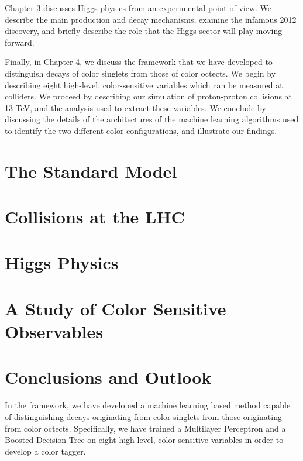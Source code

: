 \documentclass[10pt,a4paper]{book}
\begin{document}
Chapter 3 discusses Higgs physics from an experimental point of view. We describe the main production and decay mechanisms, examine the infamous 2012 discovery, and briefly describe the role that the Higgs sector will play moving forward.

Finally, in Chapter 4, we discuss the framework that we have developed to distinguish decays of color singlets from those of color octects. We begin by describing eight high-level, color-sensitive variables which can be measured at colliders. We proceed by describing our simulation of proton-proton collisions at 13 TeV, and the analysis used to extract these variables. We conclude by discussing the details of the architectures of the machine learning algorithms used to identify the two different color configurations, and illustrate our findings.

\chapter{The Standard Model}


\chapter{Collisions at the LHC}


\chapter{Higgs Physics}


\chapter{A Study of Color Sensitive Observables}


\chapter*{Conclusions and Outlook}

In the framework, we have developed a machine learning based method capable of distinguishing decays originating from color singlets from those originating from color octects. Specifically, we have trained a Multilayer Perceptron and a Boosted Decision Tree on eight high-level, color-sensitive variables in order to develop a color tagger.
\end{document}
